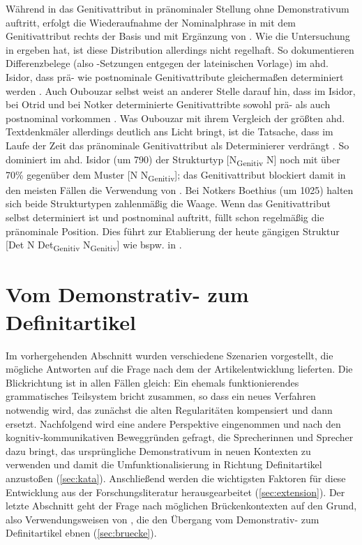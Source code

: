 \noindent
Während in  das Genitivattribut  in pränominaler Stellung ohne Demonstrativum auftritt, erfolgt die Wiederaufnahme der Nominalphrase in  mit dem Genitivattribut rechts der Basis und mit Ergänzung von . Wie die Untersuchung in \textcite{Szczepaniak2015} ergeben hat, ist diese Distribution allerdings nicht regelhaft. So dokumentieren Differenzbelege (also -Setzungen entgegen der lateinischen Vorlage) im ahd. Isidor, dass prä- wie postnominale Genitivattribute gleichermaßen determiniert werden \parencite[199]{Szczepaniak2015}. Auch Oubouzar selbst weist an anderer Stelle  darauf hin, dass im Isidor, bei Otrid und bei Notker determinierte Genitivattribte sowohl prä- als auch postnominal vorkommen \parencite[234]{Oubouzar1997}. Was Oubouzar mit ihrem Vergleich der größten ahd. Textdenkmäler allerdings deutlich ans Licht bringt, ist die Tatsache, dass  im Laufe der Zeit das pränominale Genitivattribut als Determinierer verdrängt \parencite[236ff.]{Oubouzar1997}. So dominiert im ahd. Isidor (um 790) der Strukturtyp [N\textsubscript{Genitiv} N] noch mit über 70\%  gegenüber dem Muster [N N\textsubscript{Genitiv}]; das Genitivattribut blockiert damit in den meisten Fällen die Verwendung von . Bei Notkers Boethius (um 1025) halten sich beide Strukturtypen zahlenmäßig die Waage. Wenn das Genitivattribut selbst determiniert ist und postnominal auftritt, füllt  schon regelmäßig die pränominale Position. Dies führt zur Etablierung der heute gängigen Struktur [Det N Det\textsubscript{Genitiv} N\textsubscript{Genitiv}] wie bspw. in  \parencite[241]{Oubouzar1997}. 

\section{Vom Demonstrativ- zum Definitartikel} \label{sec:demzudef}

Im vorhergehenden Abschnitt wurden verschiedene Szenarien vorgestellt, die mögliche Antworten auf die Frage nach dem  der Artikelentwicklung lieferten. Die Blickrichtung ist in allen Fällen gleich: Ein ehemals funktionierendes grammatisches Teilsystem bricht zusammen, so dass ein neues Verfahren notwendig wird, das zunächst die alten Regularitäten kompensiert und dann ersetzt. Nachfolgend wird eine andere Perspektive eingenommen und nach den kognitiv-kommunikativen Beweggründen gefragt, die Sprecherinnen und Sprecher dazu bringt, das ursprüngliche Demonstrativum in neuen Kontexten zu verwenden und damit die Umfunktionalisierung in Richtung Definitartikel anzustoßen  (\ref{sec:kata}). Anschließend werden die wichtigsten Faktoren für diese Entwicklung aus der Forschungsliteratur herausgearbeitet (\ref{sec:extension}). Der letzte Abschnitt geht der Frage nach möglichen Brückenkontexten auf den Grund, also Verwendungsweisen von , die den Übergang vom Demonstrativ- zum Definitartikel ebnen (\ref{sec:bruecke}).  


